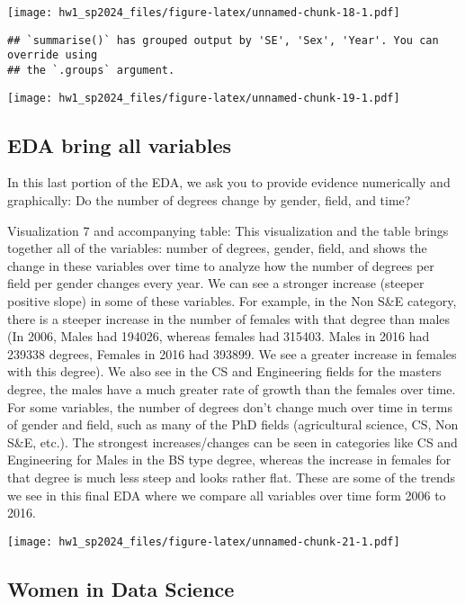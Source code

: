 \documentclass[
]{article}
\begin{document}
\texttt{[image: hw1\_sp2024\_files/figure-latex/unnamed-chunk-18-1.pdf]}

\begin{verbatim}
## `summarise()` has grouped output by 'SE', 'Sex', 'Year'. You can override using
## the `.groups` argument.
\end{verbatim}

\texttt{[image: hw1\_sp2024\_files/figure-latex/unnamed-chunk-19-1.pdf]}

\hypertarget{eda-bring-all-variables}{%
\subsection{EDA bring all variables}\label{eda-bring-all-variables}}

In this last portion of the EDA, we ask you to provide evidence
numerically and graphically: Do the number of degrees change by gender,
field, and time?

Visualization 7 and accompanying table: This visualization and the table
brings together all of the variables: number of degrees, gender, field,
and shows the change in these variables over time to analyze how the
number of degrees per field per gender changes every year. We can see a
stronger increase (steeper positive slope) in some of these variables.
For example, in the Non S\&E category, there is a steeper increase in
the number of females with that degree than males (In 2006, Males had
194026, whereas females had 315403. Males in 2016 had 239338 degrees,
Females in 2016 had 393899. We see a greater increase in females with
this degree). We also see in the CS and Engineering fields for the
masters degree, the males have a much greater rate of growth than the
females over time. For some variables, the number of degrees don't
change much over time in terms of gender and field, such as many of the
PhD fields (agricultural science, CS, Non S\&E, etc.). The strongest
increases/changes can be seen in categories like CS and Engineering for
Males in the BS type degree, whereas the increase in females for that
degree is much less steep and looks rather flat. These are some of the
trends we see in this final EDA where we compare all variables over time
form 2006 to 2016.

\texttt{[image: hw1\_sp2024\_files/figure-latex/unnamed-chunk-21-1.pdf]}

\hypertarget{women-in-data-science}{%
\subsection{Women in Data Science}\label{women-in-data-science}}
\end{document}
